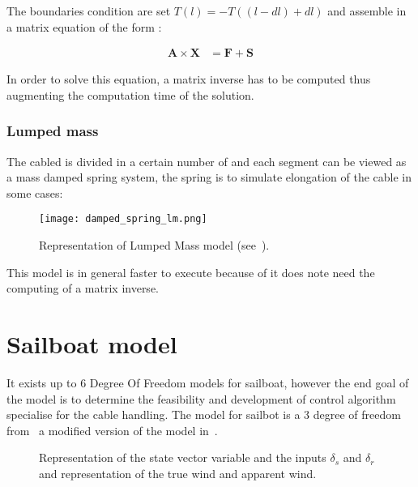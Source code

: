 The boundaries condition are set $T(l) = - T((l-dl) +dl)$ and assemble in a matrix equation of the form :

\begin{align*}
\mathbf{A}\times\mathbf{X} &= \mathbf{F}+ \mathbf{S}
\end{align*}

In order to solve this equation, a matrix inverse has to be computed thus augmenting the computation time
of the solution.
 
 
\subsubsection*{Lumped mass}
 
The cabled is divided in a certain number of and each segment can be viewed as a mass damped spring system, 
the spring is to simulate elongation of the cable in some cases:

\begin{figure}[H]
\centering
    \texttt{[image: damped\_spring\_lm.png]}
    \caption{Representation of Lumped Mass model (see~\cite{masciola2014extending}).}
    \label{fig:lm_damped}
\end{figure}

This model is in general faster to execute because of it does note need the computing of a matrix inverse.
 
\section{Sailboat model}

It exists up to 6 Degree Of Freedom models for sailboat, however the end goal of the model is to determine the feasibility and development of control algorithm specialise for the cable handling. The model for sailbot is a 3 degree of freedom  from~\cite{Melin2016} a modified version of the model in~\cite{LeBars2013}.



\begin{figure}[H]
\centering
{} %
{

}
    \caption{Representation of the state vector variable and the inputs $\delta_s$ and $\delta_r$ and representation of the true wind and apparent wind.}
    \label{fig:drawing_boat_ink}
\end{figure}


